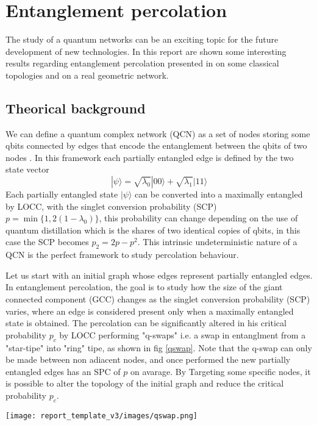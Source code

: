 \chapter{Entanglement percolation}
The study of a quantum networks can be an exciting topic for the future development of new technologies. In this report are shown some interesting results regarding entanglement percolation presented in \cite{PhysRevLett.103.240503} on some classical topologies and on a real geometric network.

\section{Theorical background}

We can define a quantum complex network (QCN) as a set of nodes storing some qbits connected by edges that encode the entanglement between the qbits of two nodes \cite{Acin2007}.
In this framework each partially entangled edge is defined by the two state vector 
\[
|\psi\rangle = \sqrt{\lambda_0}|00\rangle + \sqrt{\lambda_1}|11\rangle
\]
Each partially entangled state $|\psi\rangle$ can be converted into a maximally entangled by LOCC, with the singlet conversion probability (SCP) $p = \min\{1,2(1-\lambda_0)\}$, this probability can change depending on the use of quantum distillation which is the shares of two identical copies of qbits, in this case the SCP becomes $p_2 = 2p - p^2$. This intrinsic undeterministic nature of a QCN is the perfect framework to study percolation behaviour.

Let us start with an initial graph whose edges represent partially entangled edges. In entanglement percolation, the goal is to study how the size of the giant connected component (GCC) changes as the singlet conversion probability (SCP) varies, where an edge is considered present only when a maximally entangled state is obtained.
The percolation can be significantly altered in his critical probability $p_c$ by LOCC performing "q-swaps" i.e. a swap in entanglment from a "star-tipe" into "ring" tipe,  as shown in fig \ref{qswap}.
Note that the q-swap can only be made between non adiacent nodes, and once performed the new partially entangled edges has an SPC of $p$ on avarage. By Targeting some specific nodes, it is possible to alter the topology of the initial graph and reduce the critical probability $p_c$.

\begin{minipage}{\linewidth}
    \centering
    \label{qswap}
    \texttt{[image: report\_template\_v3/images/qswap.png]}
\end{minipage}




